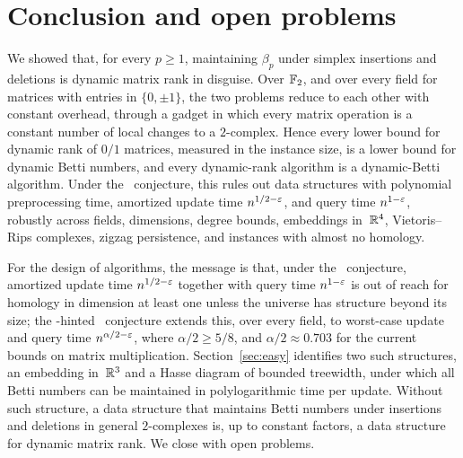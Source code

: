 \section{Conclusion and open problems}\label{sec:conclusion}

We showed that, for every $p\ge1$, maintaining $\beta_p$ under simplex insertions and deletions is dynamic matrix rank in disguise.
Over $\mathbb{F}_2$, and over every field for matrices with entries in $\{0,\pm1\}$, the two problems reduce to each other with constant overhead, through a gadget in which every matrix operation is a constant number of local changes to a $2$-complex.
Hence every lower bound for dynamic rank of $0/1$ matrices, measured in the instance size, is a lower bound for dynamic Betti numbers, and every dynamic-rank algorithm is a dynamic-Betti algorithm.
Under the \OMv\ conjecture, this rules out data structures with polynomial preprocessing time, amortized update time $n^{1/2-\varepsilon}$, and query time $n^{1-\varepsilon}$, robustly across fields, dimensions, degree bounds, embeddings in~$\mathbb{R}^4$, Vietoris--Rips complexes, zigzag persistence, and instances with almost no homology.

For the design of algorithms, the message is that, under the \OMv\ conjecture, amortized update time $n^{1/2-\varepsilon}$ together with query time $n^{1-\varepsilon}$ is out of reach for homology in dimension at least one unless the universe has structure beyond its size; the \uMv-hinted \uMv\ conjecture extends this, over every field, to worst-case update and query time $n^{\alpha/2-\varepsilon}$, where $\alpha/2\ge5/8$, and $\alpha/2\approx0.703$ for the current bounds on matrix multiplication.
Section~\ref{sec:easy} identifies two such structures, an embedding in~$\mathbb{R}^3$ and a Hasse diagram of bounded treewidth, under which all Betti numbers can be maintained in polylogarithmic time per update.
Without such structure, a data structure that maintains Betti numbers under insertions and deletions in general $2$-complexes is, up to constant factors, a data structure for dynamic matrix rank.
We close with open problems.

